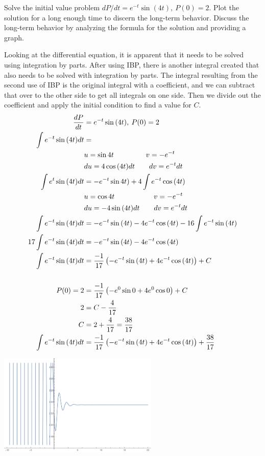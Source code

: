 \documentclass[11pt,answers]{exam}
\begin{document}
\begin{questions}

\question Solve the initial value problem $dP/dt = e^{-t}\sin(4t), \: P(0) = 2$. Plot the solution for a long enough time to discern the long-term behavior. Discuss the long-term behavior by analyzing the formula for the solution and providing a graph.

\begin{solution}
Looking at the differential equation, it is apparent that it needs to be solved using integration by parts.  After using IBP, there is another integral created that also needs to be solved with integration by parts.  The integral resulting from the second use of IBP is the original integral with a coefficient, and we can subtract that over to the other side to get all integrals on one side.  Then we divide out the coefficient and apply the initial condition to find a value for $C$.
\begin{align*}
\frac{dP}{dt} &= e^{-t}\sin{(4t)}, \: P(0) = 2 \\
\int e^{-t}\sin{(4t)} dt &= \\
&u = \sin{4t} \hbox{\hspace{4.5em}} v = -e^{-t} \\ %
&du = 4\cos{(4t)}dt \hbox{\hspace{2em}} dv = e^{-t} dt \\
\int e^{t}\sin{(4t)} dt &= -e^{-t}\sin{4t)} + 4\int e^{-t}\cos{(4t)}\\
&u = \cos{4t} \hbox{\hspace{5.5em}} v = -e^{-t} \\ %
&du = -4\sin{(4t)}dt \hbox{\hspace{2em}} dv = e^{-t} dt \\
\int e^{-t}\sin{(4t)} dt &= -e^{-t}\sin{(4t)} - 4 e^{-t}\cos{(4t)} - 16\int e^{-t}\sin{(4t)} \\
17 \int e^{-t}\sin{(4t)} dt &= -e^{-t}\sin{(4t)} - 4 e^{-t}\cos{(4t)} \\
\int e^{-t}\sin{(4t)} dt &= \frac{-1}{17}\left(-e^{-t}\sin{(4t)} + 4 e^{-t}\cos{(4t)}\right) + C \\
\\
P(0) = 2 &= \frac{-1}{17}\left(-e^0\sin{0} + 4e^{0}\cos{0}\right) + C \\
2 &= C - \frac{4}{17} \\
C &= 2 + \frac{4}{17} = \frac{38}{17}
\\
\int e^{-t}\sin{(4t)} dt &= \frac{-1}{17}\left(-e^{-t}\sin{(4t)} + 4 e^{-t}\cos{(4t)}\right) + \frac{38}{17}
\end{align*}
\centerline{\includegraphics[width = 3in]{ps1p4.png}}


\end{solution}
\end{questions}
\end{document}

